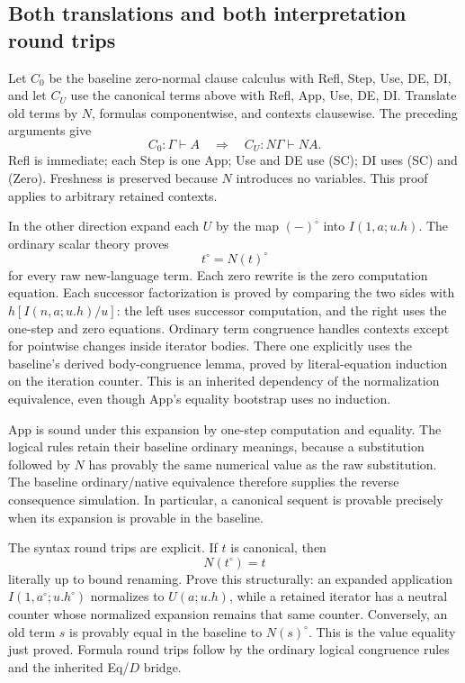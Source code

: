 \subsection{Both translations and both interpretation round trips}

Let $C_0$ be the baseline zero-normal clause calculus with Refl, Step,
Use, DE, DI, and let $C_U$ use the canonical terms above with Refl,
App, Use, DE, DI.  Translate old terms by $N$, formulas componentwise,
and contexts clausewise.  The preceding arguments give
\[
 C_0:\Gamma\vdash A
       \quad\Longrightarrow\quad
 C_U:N\Gamma\vdash NA.
\]
Refl is immediate; each Step is one App; Use and DE use (SC);
DI uses (SC) and (Zero).  Freshness is preserved because $N$ introduces
no variables.  This proof applies to arbitrary retained contexts.

In the other direction expand each $U$ by the map $(-)^\circ$ into
$I(1,a;u.h)$.  The ordinary scalar theory proves
\[
                      t^\circ=N(t)^\circ
\]
for every raw new-language term.  Each zero rewrite is the zero
computation equation.  Each successor factorization is proved by
comparing the two sides with $h[I(n,a;u.h)/u]$: the left uses successor
computation, and the right uses the one-step and zero equations.
Ordinary term congruence handles contexts except for pointwise changes
inside iterator bodies.  There one explicitly uses the baseline's
derived body-congruence lemma, proved by literal-equation induction on
the iteration counter.  This is an inherited dependency of the
normalization equivalence, even though App's equality bootstrap uses
no induction.

App is sound under this expansion by one-step computation and equality.
The logical rules retain their baseline ordinary meanings, because a
substitution followed by $N$ has provably the same numerical value as
the raw substitution.  The baseline ordinary/native equivalence
therefore supplies the reverse consequence simulation.  In
particular, a canonical sequent is provable precisely when its
expansion is provable in the baseline.

The syntax round trips are explicit.  If $t$ is canonical, then
\[
                         N(t^\circ)=t
\]
literally up to bound renaming.  Prove this structurally: an expanded
application $I(1,a^\circ;u.h^\circ)$ normalizes to $U(a;u.h)$,
while a retained iterator has a neutral counter whose normalized
expansion remains that same counter.  Conversely, an old term $s$
is provably equal in the baseline to $N(s)^\circ$.  This is the value
equality just proved.  Formula round trips follow by the ordinary
logical congruence rules and the inherited Eq/$D$ bridge.

